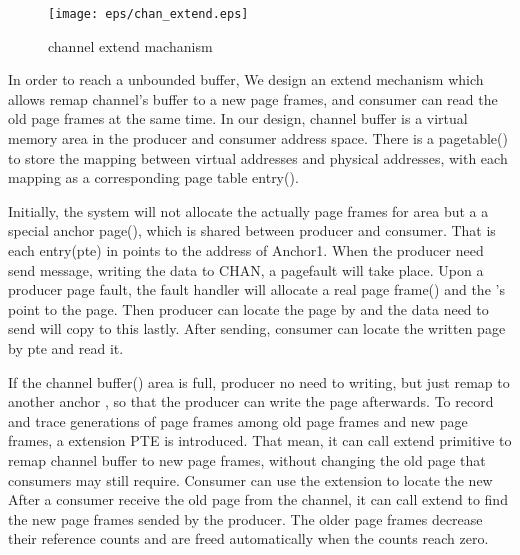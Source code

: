 \begin{figure}[!h!t]  
	\centering
	\texttt{[image: eps/chan\_extend.eps]}
	\caption{channel extend machanism}
	\label{fig:spmckern:extend}
\end{figure}
In order to reach a unbounded buffer,
We design an extend mechanism 
which allows remap channel’s buffer to a new page frames,
and consumer can read the old page frames at the same time.
In our design, channel buffer is a virtual memory area 
in the producer and consumer address space.
There is a pagetable() to store the mapping between virtual addresses and physical addresses, with each mapping as a corresponding page table entry().

Initially, the system will not allocate the actually page frames for  area but a a special anchor page(),
which is shared between producer and consumer.
That is each entry(pte) in  points to the address of Anchor1.
When the producer need send message, 
writing the data to CHAN, a pagefault will take place.
Upon a producer page fault, the fault handler will allocate a real page frame() and the 's  point to the page. 
Then producer can locate the page by  and the data need to send will copy to this  lastly.
After sending, consumer can locate the written page by pte 
and read it.

If the channel buffer() area is full, 
producer no need to writing, 
but just remap  to another anchor ,
so that the producer can write the page afterwards.
To record and trace generations of page frames among old page frames 
and new page frames, a extension PTE is introduced.
That mean,
it can call extend primitive to remap channel buffer to new page frames,
without changing the old page that consumers may still require. 
Consumer can use the extension  to locate the new
After a consumer receive the old page from the channel, 
it can call extend to find the new page frames sended by the
producer.
The older page frames decrease their reference counts and
are freed automatically when the counts reach zero.






